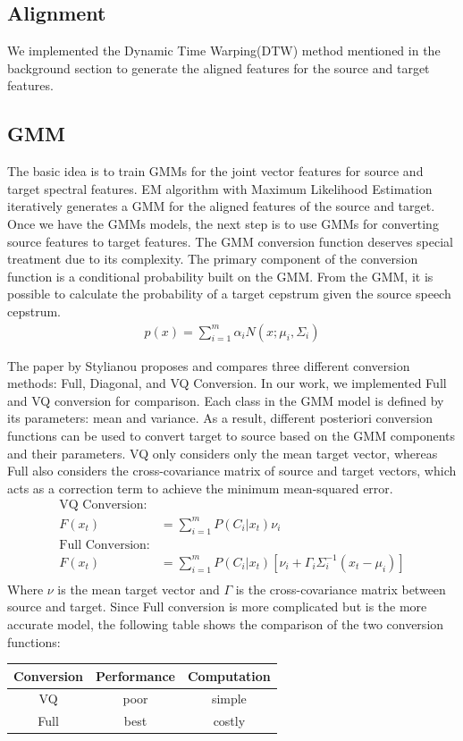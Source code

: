 \subsection{Alignment}
We implemented the Dynamic Time Warping(DTW) method mentioned in the background section to generate the aligned features for the source and target features.
\subsection{GMM}
The basic idea is to train GMMs for the joint vector features for source and target spectral features. EM algorithm with Maximum Likelihood Estimation iteratively generates a GMM for the aligned features of the source and target. 
Once we have the GMMs models, the next step is to use GMMs for converting source features to target features. The GMM conversion function deserves special treatment due to its complexity. The primary component of the conversion function is a conditional probability built on the GMM. From the GMM, it is possible to calculate the probability of a target cepstrum given the source speech cepstrum. 
\begin{align*}
    p(x) = \sum_{i=1}^m \alpha_i N(x;\mu_i,\Sigma_i)
\end{align*}

The paper by Stylianou\cite{stylianou1998continuous} proposes and compares three different conversion methods: Full, Diagonal, and VQ Conversion. In our work, we implemented Full and VQ conversion for comparison. Each class in the GMM model is defined by its parameters: mean and variance. As a result, different posteriori conversion functions can be used to convert target to source based on the GMM components and their parameters. VQ only considers only the mean target vector, whereas Full also considers the cross-covariance matrix of source and target vectors, which acts as a correction term to achieve the minimum mean-squared error.
\begin{align*}
    \text{VQ Conversion:}\\
    F(x_t) &= \sum_{i=1}^m P(C_i|x_t)\nu_i \\
    \text{Full Conversion:}\\
    F(x_t) &= \sum_{i=1}^m P(C_i|x_t)[\nu_i + \Gamma_i\Sigma_i^{-1}(x_t-\mu_i)] \\
\end{align*}
Where $\nu$  is the mean target vector and $\Gamma$ is the cross-covariance matrix between source and target.
Since Full conversion is more complicated but is the more accurate model, the following table shows the comparison of the two conversion functions:
\begin{center}
    \begin{tabular}{ | c | c | c |}
    \hline
    Conversion & Performance & Computation \\\hline
    VQ & poor & simple\\ \hline
    Full & best & costly\\ \hline
    \end{tabular}
\end{center}   
